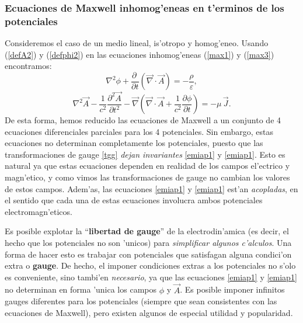 \subsubsection{Ecuaciones de Maxwell inhomog'eneas en t'erminos de los
potenciales}
Consideremos el caso de un medio lineal, is'otropo y homog'eneo. Usando (\ref{defA2}) y (\ref{defphi2}) en las ecuaciones inhomog'eneas (\ref{max1}) y (\ref{max3}) encontramos:
\begin{equation}\label{emiap1}
 \nabla^2\phi+\frac{\partial\ }{\partial t}\left(\vec{\nabla}\cdot\vec{A}\right)=-\frac{\rho}{\varepsilon},
\end{equation}
\begin{equation}\label{emiap2}
 \nabla^2\vec{A}-\frac{1}{c^2}\frac{\partial^2\vec{A}}{\partial t^2}-\vec{\nabla}\left(\vec{\nabla}\cdot\vec{A}+\frac{1}{c^2}\frac{\partial\phi }{\partial t}\right)=-\mu\,\vec{J}.
\end{equation}
De esta forma, hemos reducido las ecuaciones de Maxwell a un conjunto de 4 ecuaciones diferenciales parciales para los 4 potenciales. Sin embargo, estas ecuaciones no determinan completamente los potenciales, puesto que las transformaciones de gauge \eqref{tgg} \textit{dejan invariantes} \eqref{emiap1} y \eqref{emiap1}. Esto es natural ya que estas ecuaciones dependen en realidad de los campos el'ectrico y magn'etico, y como vimos las transformaciones de gauge no cambian los valores de estos campos. Adem'as, las ecuaciones \eqref{emiap1} y \eqref{emiap1} est'an \textit{acopladas}, en el sentido que cada una de estas ecuaciones involucra ambos potenciales electromagn'eticos.

Es posible explotar la ``\textbf{libertad de gauge}'' de la electrodin'amica (es decir, el hecho que los potenciales no son 'unicos) para \textit{simplificar algunos c'alculos}. Una forma de hacer esto es trabajar con potenciales que satisfagan alguna condici'on extra o \textbf{gauge}. De hecho, el imponer condiciones extras a los potenciales no s'olo es conveniente, sino tambi'en \textit{necesario}, ya que las ecuaciones \eqref{emiap1} y \eqref{emiap1} no determinan en forma 'unica los campos $\phi$ y $\vec{A}$. Es posible imponer infinitos gauges diferentes para los potenciales (siempre que sean consistentes con las ecuaciones de Maxwell), pero existen algunos de especial utilidad y popularidad.

